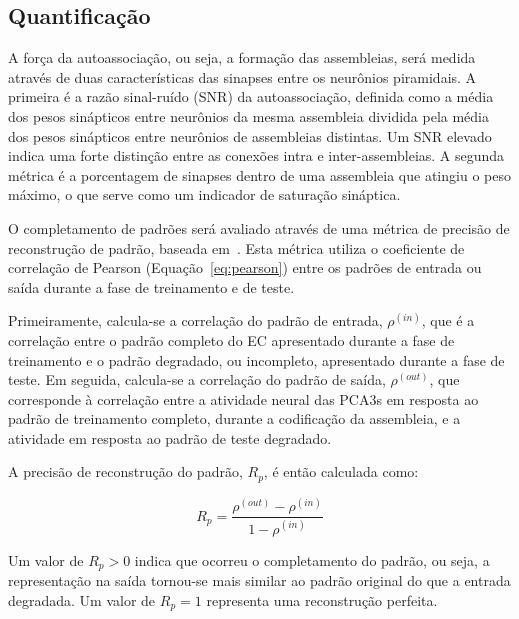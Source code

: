 \subsection{Quantificação}

A força da autoassociação, ou seja, a formação das assembleias, será medida através de duas características das sinapses entre os
neurônios piramidais. A primeira é a razão sinal-ruído (SNR) da autoassociação, definida como a média dos pesos sinápticos entre
neurônios da mesma assembleia dividida pela média dos pesos sinápticos entre neurônios de assembleias distintas. Um SNR elevado
indica uma forte distinção entre as conexões intra e inter-assembleias. A segunda métrica é a porcentagem de sinapses dentro de
uma assembleia que atingiu o peso máximo, o que serve como um indicador de saturação sináptica.

O completamento de padrões será avaliado através de uma métrica de precisão de reconstrução de padrão, baseada
em~\cite{kopsickFormation2024}. Esta métrica utiliza o coeficiente de correlação de Pearson (Equação~\ref{eq:pearson}) entre os
padrões de entrada ou saída durante a fase de treinamento e de teste. 

Primeiramente, calcula-se a correlação do padrão de entrada, $\rho^{(in)}$, que é a correlação entre o padrão completo do EC
apresentado durante a fase de treinamento e o padrão degradado, ou incompleto, apresentado durante a fase de teste. Em seguida,
calcula-se a correlação do padrão de saída, $\rho^{(out)}$, que corresponde à correlação entre a atividade neural das PCA3s em
resposta ao padrão de treinamento completo, durante a codificação da assembleia, e a atividade em resposta ao padrão de teste
degradado.

A precisão de reconstrução do padrão, $R_p$, é então calculada como:

\begin{equation}
    \label{eq:rp}
    R_p = \frac{\rho^{(out)} - \rho^{(in)}}{1 - \rho^{(in)}}
\end{equation}

Um valor de $R_p > 0$ indica que ocorreu o completamento do padrão, ou seja, a representação na saída tornou-se mais similar ao
padrão original do que a entrada degradada. Um valor de $R_p = 1$ representa uma reconstrução perfeita.
